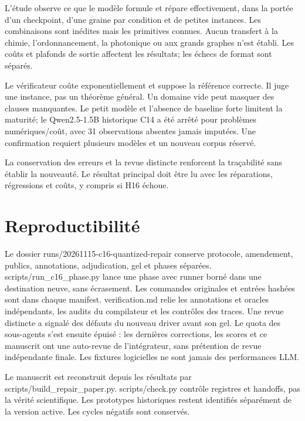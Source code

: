\documentclass[11pt]{article}
\begin{document}
L'étude observe ce que le modèle formule et répare effectivement, dans la portée d'un checkpoint, d'une graine par condition et de petites instances. Les combinaisons sont inédites mais les primitives connues. Aucun transfert à la chimie, l'ordonnancement, la photonique ou aux grands graphes n'est établi. Les coûts et plafonds de sortie affectent les résultats; les échecs de format sont séparés.

Le vérificateur coûte exponentiellement et suppose la référence correcte. Il juge une instance, pas un théorème général. Un domaine vide peut masquer des clauses manquantes. Le petit modèle et l'absence de baseline forte limitent la maturité; le Qwen2.5-1.5B historique C14 a été arrêté pour problèmes numériques/coût, avec 31 observations absentes jamais imputées. Une confirmation requiert plusieurs modèles et un nouveau corpus réservé.

La conservation des erreurs et la revue distincte renforcent la traçabilité sans établir la nouveauté. Le résultat principal doit être lu avec les réparations, régressions et coûts, y compris si H16 échoue.

\section{Reproductibilité}

Le dossier runs/20261115-c16-quantized-repair conserve protocole, amendement, publics, annotations, adjudication, gel et phases séparées. scripts/run\_c16\_phase.py lance une phase avec runner borné dans une destination neuve, sans écrasement. Les commandes originales et entrées hashées sont dans chaque manifest. verification.md relie les annotations et oracles indépendants, les audits du compilateur et les contrôles des traces. Une revue distincte a signalé des défauts du nouveau driver avant son gel. Le quota des sous-agents s'est ensuite épuisé : les dernières corrections, les scores et ce manuscrit ont une auto-revue de l'intégrateur, sans prétention de revue indépendante finale. Les fixtures logicielles ne sont jamais des performances LLM.

Le manuscrit est reconstruit depuis les résultats par scripts/build\_repair\_paper.py. scripts/check.py contrôle registres et handoffs, pas la vérité scientifique. Les prototypes historiques restent identifiés séparément de la version active. Les cycles négatifs sont conservés.
\end{document}
